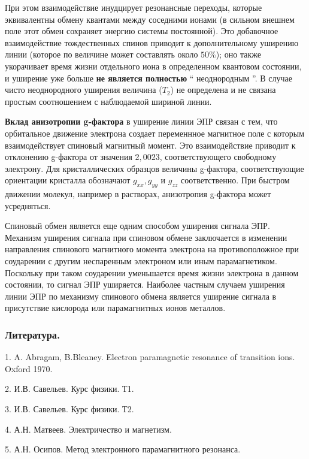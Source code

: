 \documentclass{beamer}
\begin{document}
\begin{frame}
\scriptsize{ При этом взаимодействие инудцирует резонансные переходы, которые эквивалентны обмену квантами между соседними ионами (в сильном внешнем поле этот обмен сохраняет энергию системы постоянной). Это добавочное взаимодействие тождественных спинов приводит к дополнительному уширению линии (которое по величине может составлять около $50 \%  $); оно также укорачивает время жизни отдельного иона в определенном квантовом состоянии, и уширение уже больше \textbf{ не является полностью} `` неоднородным ''. В случае чисто неоднородного уширения величина ($T_{2}$) не определена и не связана простым соотношением с наблюдаемой шириной линии.

\textbf{Вклад анизотропии g-фактора} в уширение линии ЭПР связан с тем, что орбитальное движение электрона создает переменнное магнитное поле с которым взаимодействует спиновый магнитный момент. Это взаимодействие приводит к отклонению g-фактора от значения  $ 2,0023$, соответствующего свободному электрону. Для кристаллических образцов величины g-фактора, соответствующие ориентации кристалла обозначают $g_{xx}, g_{yy}$ и $g_{zz}$ соответственно. При быстром движении молекул, например в растворах, анизотропия g-фактора может усредняться.

Спиновый обмен является еще одним способом уширения сигнала ЭПР. Механизм уширения сигнала при спиновом обмене заключается в изменении направления спинового магнитного момента электрона на противоположное при соударении с другим неспаренным электроном или иным парамагнетиком. Поскольку при таком соударении уменьшается время жизни электрона в данном состоянии, то сигнал ЭПР уширяется. Наиболее частным случаем уширения линии ЭПР по механизму спинового обмена является уширение сигнала в присутствие кислорода или парамагнитных ионов металлов.
}
\end{frame}

\begin{frame}
\frametitle{Литература.}
\begin{block}{}
1. A. Abragam, B.Bleaney. Electron paramagnetic resonance of transition ions. Oxford 1970.

2. И.В. Савельев. Курс физики. Т1.

3. И.В. Савельев. Курс физики. Т2.

4. А.Н. Матвеев. Электричество и магнетизм.

5. А.Н. Осипов. Метод электронного парамагнитного резонанса.
\end{block}
\end{frame}
\end{document}

